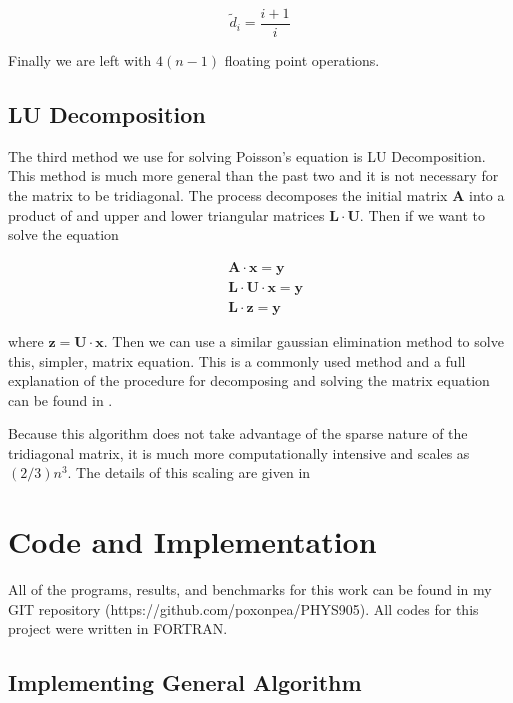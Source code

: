 \documentclass[%
oneside,                 %
final,                   %
10pt]{article}
\begin{document}
\begin{equation*}
\tilde{d}_i=\frac{i+1}{i}
\end{equation*}

Finally we are left with $4(n-1)$ floating point operations.

\subsection{LU Decomposition}

The third method we use for solving Poisson's equation is LU Decomposition.  This method is much more general than the past two and it is not necessary for the matrix to be tridiagonal. The process decomposes the initial matrix $\mathbf{A}$ into a product of and upper and lower triangular matrices $\mathbf{L} \cdot \mathbf{U}$.  Then if we want to solve the equation

\begin{equation*}
\begin{split}
&\mathbf{A} \cdot \mathbf{x} = \mathbf{y} \\
&\mathbf{L} \cdot \mathbf{U} \cdot \mathbf{x} = \mathbf{y}\\
& \mathbf{L} \cdot \mathbf{z} = \mathbf{y}
\end{split}
\end{equation*}

where $\mathbf{z}=\mathbf{U} \cdot \mathbf{x}$.  Then we can use a similar gaussian elimination method to solve this, simpler, matrix equation.  This is a commonly used method and a full explanation of the procedure for decomposing and solving the matrix equation can be found in \cite{LectureNotes}.

Because this algorithm does not take advantage of the sparse nature of the tridiagonal matrix, it is much more computationally intensive and scales as $(2/3) n^3$.  The details of this scaling are given in \cite{Chiarandini}


\section{Code and Implementation}

All of the programs, results, and benchmarks for this work can be found in my GIT repository (https://github.com/poxonpea/PHYS905).  All codes for this project were written in FORTRAN.

\subsection{Implementing General Algorithm}
\end{document}
